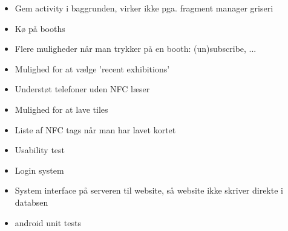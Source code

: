 \begin{itemize}
\item Gem activity i baggrunden, virker ikke pga. fragment manager griseri
\item Kø på booths
\item Flere muligheder når man trykker på en booth: (un)subscribe, ...
\item Mulighed for at vælge 'recent exhibitions'
\item Understøt telefoner uden NFC læser
\item Mulighed for at lave tiles
\item Liste af NFC tags når man har lavet kortet
\item Usability test
\item Login system
\item System interface på serveren til website, så website ikke skriver direkte i databsen
\item android unit tests
\end{itemize}